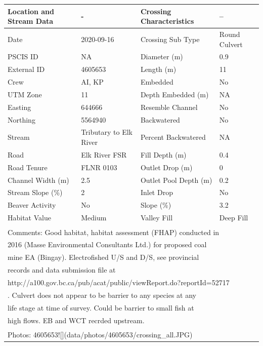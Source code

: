 \documentclass[
]{book}
\begin{document}
\begin{tabular}{l|l|l|l}
\hline
Location and Stream Data & - & Crossing Characteristics & --\\
\hline
Date & 2020-09-16 & Crossing Sub Type & Round Culvert\\
\hline
PSCIS ID & NA & Diameter (m) & 0.9\\
\hline
External ID & 4605653 & Length (m) & 11\\
\hline
Crew & AI, KP & Embedded & No\\
\hline
UTM Zone & 11 & Depth Embedded (m) & NA\\
\hline
Easting & 644666 & Resemble Channel & No\\
\hline
Northing & 5564940 & Backwatered & No\\
\hline
Stream & Tributary to Elk River & Percent Backwatered & NA\\
\hline
Road & Elk River FSR & Fill Depth (m) & 0.4\\
\hline
Road Tenure & FLNR 0103 & Outlet Drop (m) & 0\\
\hline
Channel Width (m) & 2.5 & Outlet Pool Depth (m) & 0.2\\
\hline
Stream Slope (\%) & 2 & Inlet Drop & No\\
\hline
Beaver Activity & No & Slope (\%) & 3.2\\
\hline
Habitat Value & Medium & Valley Fill & Deep Fill\\
\hline
\multicolumn{4}{l}{\textsuperscript{} Comments: Good habitat, habitat assessment (FHAP) conducted in}\\
\multicolumn{4}{l}{2016 (Masse Environmental Consultants Ltd.) for proposed coal}\\
\multicolumn{4}{l}{mine EA (Bingay). Electrofished U/S and D/S, see provincial}\\
\multicolumn{4}{l}{records and data submission file at}\\
\multicolumn{4}{l}{http://a100.gov.bc.ca/pub/acat/public/viewReport.do?reportId=52717}\\
\multicolumn{4}{l}{. Culvert does not appear to be barrier to any species at any}\\
\multicolumn{4}{l}{life stage at time of survey.  Could be barrier to small fish at}\\
\multicolumn{4}{l}{high flows. EB and WCT recrded upstream.}\\
\multicolumn{4}{l}{\textsuperscript{} Photos: 4605653![](data/photos/4605653/crossing\_all.JPG)}\\
\end{tabular}
\end{document}
